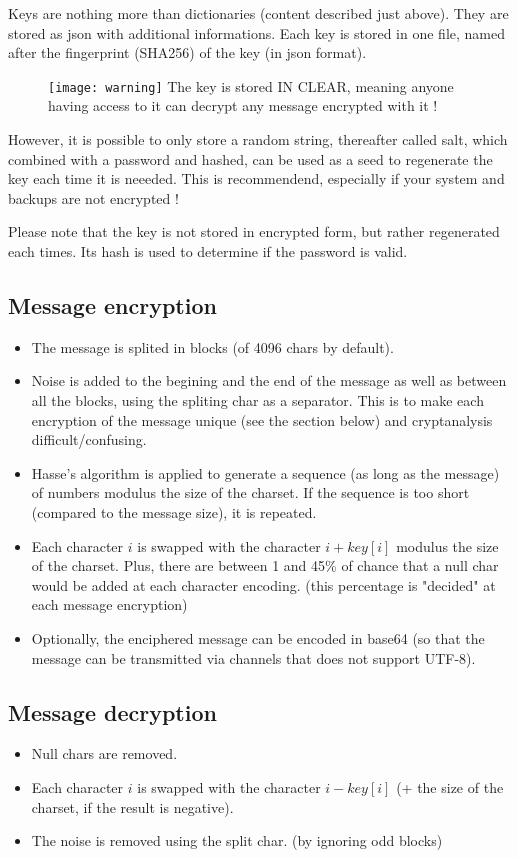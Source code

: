 Keys are nothing more than dictionaries (content described just above). They are stored as json with additional informations. Each 
key is stored in one file, named after the fingerprint (SHA256) of the key (in json format).

\begin{figure}[H]
    \texttt{[image: warning]}
    The key is stored IN CLEAR, meaning anyone having access to it can decrypt any message encrypted with it !
\end{figure}

However, it is possible to only store a random string, thereafter called salt, which combined with a password and hashed, can be used 
as a seed to regenerate the key each time it is neeeded. This is recommendend, especially if your system and backups are not encrypted !

Please note that the key is not stored in encrypted form, but rather regenerated each times. Its hash is used to determine if the password 
is valid.


\subsection{Message encryption}
\begin{itemize}
    \item The message is splited in blocks (of 4096 chars by default). 
    \item Noise is added to the begining and the end of the message as well as between all the blocks, using the spliting char as a separator. 
          This is to make each encryption of the message unique (see the section below) and cryptanalysis difficult/confusing.
    \item Hasse's algorithm is applied to generate a sequence (as long as the message) of numbers modulus the size of the charset. If 
          the sequence is too short (compared to the message size), it is repeated.
    \item Each character $i$ is swapped with the character $i + key[i]$ modulus the size of the charset. Plus, there are between 1 and 45\% 
          of chance that a null char would be added at each character encoding. (this percentage is "decided" at each message encryption)
    \item Optionally, the enciphered message can be encoded in base64 (so that the message can be transmitted via channels that does not 
          support UTF-8).
\end{itemize}

\subsection{Message decryption}
\begin{itemize}
    \item Null chars are removed.
    \item Each character $i$ is swapped with the character $i - key[i]$ (+ the size of the charset, if the result is negative).
    \item The noise is removed using the split char. (by ignoring odd blocks)
\end{itemize}